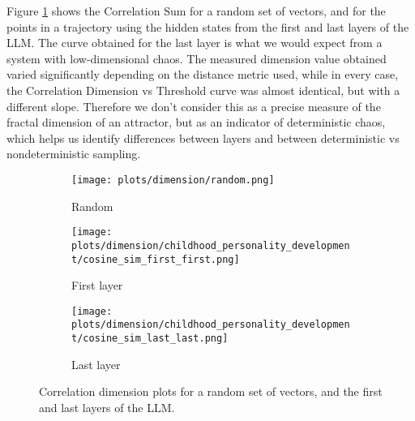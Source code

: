 \documentclass[a4paper,12pt]{article}
\begin{document}
Figure \ref{fig:dim_first_last} shows the Correlation Sum for a random set of vectors, and for the points in a trajectory using the hidden states from the first and last layers of the LLM. The curve obtained for the last layer is what we would expect from a system with low-dimensional chaos. The measured dimension value obtained varied significantly depending on the distance metric used, while in every case, the Correlation Dimension vs Threshold curve was almost identical, but with a different slope. Therefore we don't consider this as a precise measure of the fractal dimension of an attractor, but as an indicator of deterministic chaos, which helps us identify differences between layers and between deterministic vs nondeterministic sampling.

\begin{figure}[H]
    \centering
    \begin{subfigure}[b]{0.32\textwidth}
        \centering
        \texttt{[image: plots/dimension/random.png]}
        \caption{Random}
    \end{subfigure}\hfill
    \centering
    \begin{subfigure}[b]{0.32\textwidth}
        \centering
        \texttt{[image: plots/dimension/childhood\_personality\_development/cosine\_sim\_first\_first.png]}
        \caption{First layer}
    \end{subfigure}\hfill
    \begin{subfigure}[b]{0.32\textwidth}
        \centering
        \texttt{[image: plots/dimension/childhood\_personality\_development/cosine\_sim\_last\_last.png]}
        \caption{Last layer}
    \end{subfigure}

    \caption{Correlation dimension plots for a random set of vectors, and the first and last layers of the LLM.}
    \label{fig:dim_first_last}
\end{figure}
\end{document}
